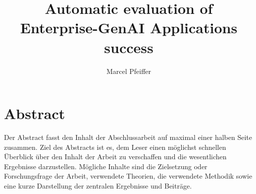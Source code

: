 \documentclass[
	english,
	ruledheaders=section,%
	class=report,%
	thesis={type=bachelor},%
	accentcolor=1b,%
	custommargins=true,%
	marginpar=false,%
	parskip=half-,%
	fontsize=11pt,%
	DIV=14,
]{tudapub}
\begin{document}


\title{Automatic evaluation of Enterprise-GenAI Applications success}

\author[M. Pfeiffer]{Marcel Pfeiffer}%


\submissiondate{\today}
\examdate{\today}


\maketitle

\affidavit


\chapter*{Abstract}
Der Abstract fasst den Inhalt der Abschlussarbeit auf maximal einer halben Seite zusammen. Ziel des Abstracts ist es, dem Leser einen möglichst schnellen Überblick über den Inhalt der Arbeit zu verschaffen und die wesentlichen Ergebnisse darzustellen. Mögliche Inhalte sind die Zielsetzung oder Forschungsfrage der Arbeit, verwendete Theorien, die verwendete Methodik sowie eine kurze Darstellung der zentralen Ergebnisse und Beiträge.

\tableofcontents



\end{document}
